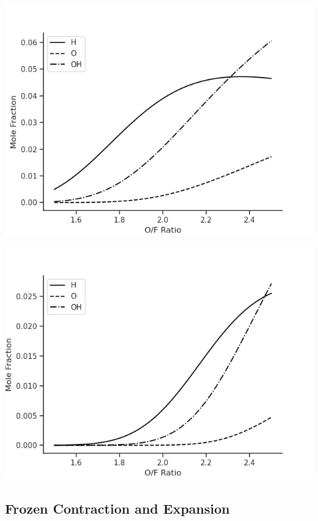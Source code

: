 \documentclass[11pt]{article}
\begin{document}
\begin{minipage}{.5\linewidth}
  \centering
  \includegraphics[width=\linewidth]{dissociated-chamber.png}
\end{minipage}%
\begin{minipage}{.5\linewidth}
  \centering
  \includegraphics[width=\linewidth]{dissociated-nozzle.png}
\end{minipage}

\subsection{Frozen Contraction and Expansion}
\end{document}
